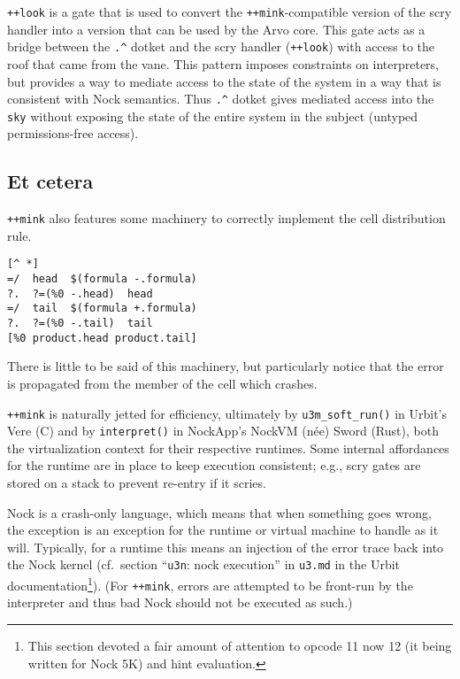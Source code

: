 \documentclass[twoside]{article}
\begin{document}
\lstinline[style=inlinecode]{++look} is a gate that is used to convert the \lstinline[style=inlinecode]{++mink}-compa\-tible version of the scry handler into a version that can be used by the Arvo core.  This gate acts as a bridge between the \lstinline[style=inlinecode]{.^} dotket and the scry handler (\lstinline[style=inlinecode]{++look}) with access to the roof that came from the vane.  This pattern imposes constraints on interpreters, but provides a way to mediate access to the state of the system in a way that is consistent with Nock semantics.   Thus \lstinline[style=inlinecode]{.^} dotket gives mediated access into the \lstinline[style=inlinecode]{sky} without exposing the state of the entire system in the subject (untyped permissions-free access).

\subsection{Et cetera}

\lstinline[style=inlinecode]{++mink} also features some machinery to correctly implement the cell distribution rule.

\begin{lstlisting}[style=listingcode]
  [^ *]
=/  head  $(formula -.formula)
?.  ?=(%0 -.head)  head
=/  tail  $(formula +.formula)
?.  ?=(%0 -.tail)  tail
[%0 product.head product.tail]
\end{lstlisting}

\noindent
There is little to be said of this machinery, but particularly notice that the error is propagated from the member of the cell which crashes.

\sloppy
\lstinline[style=inlinecode]{++mink} is naturally jetted for efficiency, ultimately by \lstinline[style=inlinecode]{u3m_soft_run()} in Urbit's Vere (C) and by \lstinline[style=inlinecode]{interpret()} in NockApp's NockVM (n\'{e}e) Sword (Rust), both the virtualization context for their respective runtimes.  Some internal affordances for the runtime are in place to keep execution consistent; e.g., scry gates are stored on a stack to prevent re-entry if it scries.

Nock is a crash-only language, which means that when something goes wrong, the exception is an exception for the runtime or virtual machine to handle as it will.  Typically, for a runtime this means an injection of the error trace back into the Nock kernel (cf.\ section ``\texttt{u3n}: nock execution'' in \texttt{u3.md} in the Urbit documentation\footnote{This section devoted a fair amount of attention to opcode 11 now 12 (it being written for Nock 5K) and hint evaluation.}).  (For \lstinline[style=inlinecode]{++mink}, errors are attempted to be front-run by the interpreter and thus bad Nock should not be executed as such.)
\end{document}
